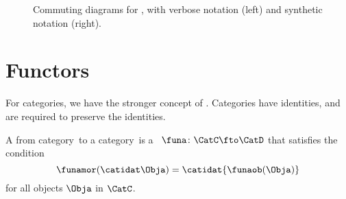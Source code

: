 \vfill

\begin{figure*}[h!]
    \caption{
        Commuting diagrams for , with verbose notation (left) and synthetic notation (right).
    }
\end{figure*}

\vspace{2cm}

\section{Functors}
\label{sec:functors}

For categories, we have the stronger concept of .
Categories have identities, and  are required to preserve the identities.

\begin{ctdefinition}[Functor]
    \label{def:functor}
    A  from category~\CatC to a category~\CatD is a ~$\funa\colon \CatC \fto \CatD$
    that satisfies the condition
    \begin{equation}
        \label{eq:functor-condition}
        \funamor(\catidat\Obja)=\catidat{\funaob(\Obja)}
    \end{equation}
    for all objects $\Obja$ in $\CatC$.
\end{ctdefinition}

